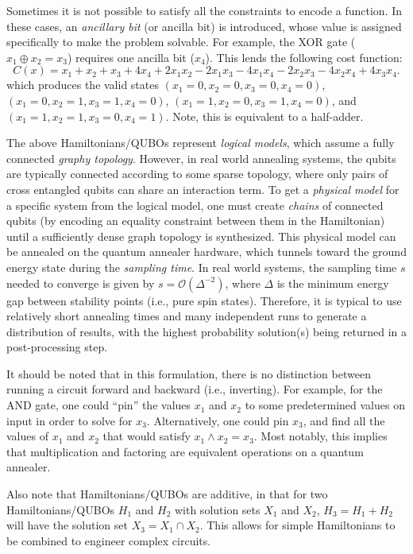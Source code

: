 \documentclass[12pt]{article}
\begin{document}
Sometimes it is not possible to satisfy all the constraints to encode
a function.
In these cases, an {\it ancillary bit} (or ancilla bit) is introduced,
whose value is assigned specifically to make the problem solvable.
For example, the XOR gate ($x_1 \oplus x_2 = x_3$) requires one ancilla bit
($x_4$). This lends the following cost function:
$$
C(x) = x_1 + x_2 + x_3 + 4x_4 
	+ 2x_1x_2 - 2x_1x_3 - 4x_1x_4 
	- 2x_2x_3 - 4x_2x_4
	+ 4x_3x_4.
$$
which produces the valid states
$(x_1 = 0, x_2 = 0, x_3 = 0, x_4 = 0)$, 
$(x_1 = 0, x_2 = 1, x_3 = 1, x_4 = 0)$, 
$(x_1 = 1, x_2 = 0, x_3 = 1, x_4 = 0)$, and
$(x_1 = 1, x_2 = 1, x_3 = 0, x_4 = 1)$.
Note, this is equivalent to a half-adder.

The above Hamiltonians/QUBOs represent {\it logical models}, which assume
a fully connected {\it graphy topology}.
However, in real world annealing systems, the qubits are typically
connected according to some sparse topology, where only pairs of
cross entangled qubits can share an interaction term.
To get a {\it physical model} for a specific system from the logical model,
one must create {\it chains} of connected qubits (by encoding an equality
constraint between them in the Hamiltonian) until a sufficiently dense
graph topology is synthesized.
This physical model can be annealed on the quantum annealer hardware, which
tunnels toward the ground energy state during the {\it sampling time}.
In real world systems, the sampling time $s$ needed to converge
is given by $s = \mathcal{O}(\Delta^{-2})$,
where $\Delta$ is the minimum energy gap between stability points
(i.e., pure spin states).
Therefore, it is typical to use relatively short annealing times and
many independent runs to generate a distribution of results, with the
highest probability solution(s) being returned in a post-processing step.

It should be noted that in this formulation, there is no distinction between
running a circuit forward and backward (i.e., inverting).
For example, for the AND gate, one could ``pin'' the values $x_1$ and $x_2$
to some predetermined values on input in order to solve for $x_3$.
Alternatively, one could pin $x_3$, and find all the values of $x_1$ and $x_2$
that would satisfy $x_1 \wedge x_2 = x_3$.
Most notably, this implies that multiplication and factoring are equivalent
operations on a quantum annealer.

Also note that Hamiltonians/QUBOs are additive, in that for two
Hamiltonians/QUBOs $H_1$ and $H_2$ with solution sets $X_1$ and $X_2$,
$H_3 = H_1 + H_2$ will have the solution set $X_3 = X_1 \cap X_2$.
This allows for simple Hamiltonians to be combined to engineer complex
circuits.
\end{document}
